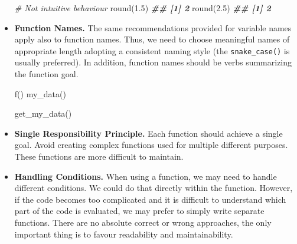 \documentclass[
  11pt,
]{book}
\newenvironment{Shaded}{\begin{snugshade}}{\end{snugshade}}
\newcommand{\CommentTok}[1]{\textcolor[rgb]{0.56,0.35,0.01}{\textit{#1}}}
\newcommand{\DocumentationTok}[1]{\textcolor[rgb]{0.56,0.35,0.01}{\textbf{\textit{#1}}}}
\newcommand{\FloatTok}[1]{\textcolor[rgb]{0.00,0.00,0.81}{#1}}
\newcommand{\FunctionTok}[1]{\textcolor[rgb]{0.00,0.00,0.00}{#1}}
\newcommand{\NormalTok}[1]{#1}
\newenvironment{code-tex-bad}
  {\begingroup\definecolor{shadecolor}{RGB}{255, 189, 185}}
  {\endgroup}
\newenvironment{code-tex-good}
  {\begingroup\definecolor{shadecolor}{RGB}{224, 240, 227}}
  {\endgroup}
\newenvironment{code-tex-warn}
  {\begingroup\definecolor{shadecolor}{RGB}{249, 249, 154}}
  {\endgroup}
\begin{document}
\begin{itemize}
\begin{code-tex-good}
  \end{code-tex-good}

  \begin{code-tex-warn}

\begin{Shaded}
\begin{Highlighting}[]
\CommentTok{\# Not intuitive behaviour}
\FunctionTok{round}\NormalTok{(}\FloatTok{1.5}\NormalTok{)}
\DocumentationTok{\#\# [1] 2}
\FunctionTok{round}\NormalTok{(}\FloatTok{2.5}\NormalTok{)}
\DocumentationTok{\#\# [1] 2}
\end{Highlighting}
\end{Shaded}

  \end{code-tex-warn}
\item
  \textbf{Function Names.} The same recommendations provided for variable names apply also to function names. Thus, we need to choose meaningful names of appropriate length adopting a consistent naming style (the \texttt{snake\_case()} is usually preferred). In addition, function names should be verbs summarizing the function goal.

  \begin{code-tex-bad}

\begin{Shaded}
\begin{Highlighting}[]
\FunctionTok{f}\NormalTok{()}
\FunctionTok{my\_data}\NormalTok{()}
\end{Highlighting}
\end{Shaded}

  \end{code-tex-bad}

  \begin{code-tex-good}

\begin{Shaded}
\begin{Highlighting}[]
\FunctionTok{get\_my\_data}\NormalTok{()}
\end{Highlighting}
\end{Shaded}

  \end{code-tex-good}
\item
  \textbf{Single Responsibility Principle.} Each function should achieve a single goal. Avoid creating complex functions used for multiple different purposes. These functions are more difficult to maintain.
\item
  \textbf{Handling Conditions.} When using a function, we may need to handle different conditions. We could do that directly within the function. However, if the code becomes too complicated and it is difficult to understand which part of the code is evaluated, we may prefer to simply write separate functions. There are no absolute correct or wrong approaches, the only important thing is to favour readability and maintainability.


\end{itemize}
\end{document}
